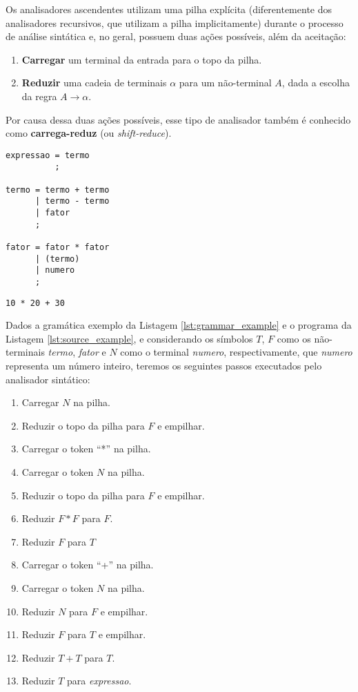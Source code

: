 Os analisadores ascendentes utilizam uma pilha explícita (diferentemente dos
analisadores recursivos, que utilizam a pilha implicitamente) durante o processo de
análise sintática e, no geral, possuem duas ações possíveis, além da aceitação:

\begin{enumerate}
	\item \textbf{Carregar} um terminal da entrada para o topo da pilha.
	\item \textbf{Reduzir} uma cadeia de terminais $\alpha$ para um não-terminal
	      $A$, dada a escolha da regra $A \rightarrow \alpha$.
\end{enumerate}

Por causa dessa duas ações possíveis, esse tipo de analisador também é
conhecido como \textbf{carrega-reduz} (ou \emph{shift-reduce}).

\begin{lstlisting}[label=lst:grammar_example, caption=Gramática Exemplo]
expressao = termo
          ;

termo = termo + termo
      | termo - termo
      | fator
      ;

fator = fator * fator
      | (termo)
      | numero
      ;
\end{lstlisting}

\begin{lstlisting}[label=lst:source_example, caption=Programa Exemplo]
10 * 20 + 30
\end{lstlisting}

Dados a gramática exemplo da Listagem \ref{lst:grammar_example} e o programa
da Listagem \ref{lst:source_example}, e considerando os símbolos $T$, $F$ como
os não-terminais \emph{termo}, \emph{fator} e $N$ como o terminal \emph{numero},
respectivamente, que \emph{numero} representa um número inteiro, teremos os
seguintes passos executados pelo analisador sintático:

\begin{enumerate}
  \item Carregar $N$ na pilha.
  \item Reduzir o topo da pilha para $F$ e empilhar.
  \item Carregar o token ``*'' na pilha.
  \item Carregar o token $N$ na pilha.
  \item Reduzir o topo da pilha para $F$ e empilhar.
  \item Reduzir $F*F$ para $F$.
	\item Reduzir $F$ para $T$
  \item Carregar o token ``+'' na pilha.
  \item Carregar o token $N$ na pilha.
  \item Reduzir $N$ para $F$ e empilhar.
  \item Reduzir $F$ para $T$ e empilhar.
  \item Reduzir $T+T$ para $T$.
	\item Reduzir $T$ para \emph{expressao}.
\end{enumerate}

